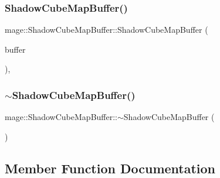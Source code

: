 \hypertarget{structmage_1_1_shadow_cube_map_buffer_abd70f932d354f9922e311330e0c2bcd8}{}\label{structmage_1_1_shadow_cube_map_buffer_abd70f932d354f9922e311330e0c2bcd8} 
\subsubsection{\texorpdfstring{Shadow\+Cube\+Map\+Buffer()}{ShadowCubeMapBuffer()}\hspace{0.1cm}{\footnotesize\ttfamily [4/4]}}
{\footnotesize\ttfamily mage\+::\+Shadow\+Cube\+Map\+Buffer\+::\+Shadow\+Cube\+Map\+Buffer (\begin{DoxyParamCaption}\item[{\hyperlink{structmage_1_1_shadow_cube_map_buffer}{Shadow\+Cube\+Map\+Buffer} \&\&}]{buffer }\end{DoxyParamCaption})\hspace{0.3cm}{\ttfamily [default]}, {\ttfamily [noexcept]}}

\hypertarget{structmage_1_1_shadow_cube_map_buffer_ad84dab42c8391819f93f9e60acd4655d}{}\label{structmage_1_1_shadow_cube_map_buffer_ad84dab42c8391819f93f9e60acd4655d} 
\subsubsection{\texorpdfstring{$\sim$\+Shadow\+Cube\+Map\+Buffer()}{~ShadowCubeMapBuffer()}}
{\footnotesize\ttfamily mage\+::\+Shadow\+Cube\+Map\+Buffer\+::$\sim$\+Shadow\+Cube\+Map\+Buffer (\begin{DoxyParamCaption}{ }\end{DoxyParamCaption})\hspace{0.3cm}{\ttfamily [default]}}



\subsection{Member Function Documentation}
\hypertarget{structmage_1_1_shadow_cube_map_buffer_a6c970efc7fda17010f5e59923e7651e2}{}\label{structmage_1_1_shadow_cube_map_buffer_a6c970efc7fda17010f5e59923e7651e2} 
